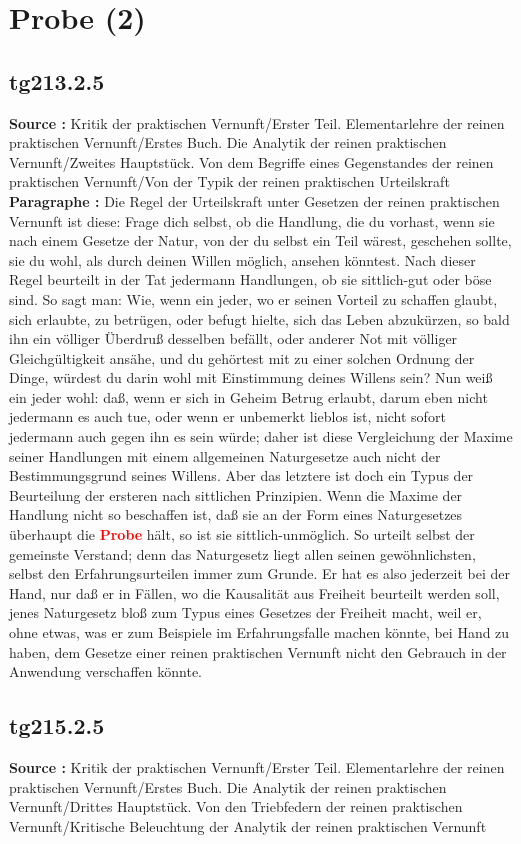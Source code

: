 \documentclass[a4paper,12pt,twoside]{book}
\newcommand{\match}[1]{\textcolor{red}{\textbf{#1}}}
\newcommand{\unnumberedsection}[1]{
	\section*{#1}
	\addcontentsline{toc}{section}{#1}
	\markright{#1}
}
\begin{document}
	\unnumberedsection{Probe (2)} 
	\subsection*{tg213.2.5} 
	\textbf{Source : }Kritik der praktischen Vernunft/Erster Teil. Elementarlehre der reinen praktischen Vernunft/Erstes Buch. Die Analytik der reinen praktischen Vernunft/Zweites Hauptstück. Von dem Begriffe eines Gegenstandes der reinen praktischen Vernunft/Von der Typik der reinen praktischen Urteilskraft\\  
	
	\noindent\textbf{Paragraphe : }Die Regel der Urteilskraft unter Gesetzen der reinen praktischen Vernunft ist diese: Frage dich selbst, ob die Handlung, die du vorhast, wenn sie nach einem Gesetze der Natur, von der du selbst ein Teil wärest, geschehen sollte, sie du wohl, als durch deinen Willen möglich, ansehen könntest. Nach dieser Regel beurteilt in der Tat jedermann Handlungen, ob sie sittlich-gut oder böse sind. So sagt man: Wie, wenn ein jeder, wo er seinen Vorteil zu schaffen glaubt, sich erlaubte, zu betrügen, oder befugt hielte, sich das Leben abzukürzen, so bald ihn ein völliger Überdruß desselben befällt, oder anderer Not mit völliger Gleichgültigkeit ansähe,  und du gehörtest mit zu einer solchen Ordnung der Dinge, würdest du darin wohl mit Einstimmung deines Willens sein? Nun weiß ein jeder wohl: daß, wenn er sich in Geheim Betrug erlaubt, darum eben nicht jedermann es auch tue, oder wenn er unbemerkt lieblos ist, nicht sofort jedermann auch gegen ihn es sein würde; daher ist diese Vergleichung der Maxime seiner Handlungen mit einem allgemeinen Naturgesetze auch nicht der Bestimmungsgrund seines Willens. Aber das letztere ist doch ein Typus der Beurteilung der ersteren nach sittlichen Prinzipien. Wenn die Maxime der Handlung nicht so beschaffen ist, daß sie an der Form eines Naturgesetzes überhaupt die \match{Probe} hält, so ist sie sittlich-unmöglich. So urteilt selbst der gemeinste Verstand; denn das Naturgesetz liegt allen seinen gewöhnlichsten, selbst den Erfahrungsurteilen immer zum Grunde. Er hat es also jederzeit bei der Hand, nur daß er in Fällen, wo die Kausalität aus Freiheit beurteilt werden soll, jenes Naturgesetz bloß zum Typus eines Gesetzes der Freiheit macht, weil er, ohne etwas, was er zum Beispiele im Erfahrungsfalle machen könnte, bei Hand zu haben, dem Gesetze einer reinen praktischen Vernunft nicht den Gebrauch in der Anwendung verschaffen könnte. 
	
	\subsection*{tg215.2.5} 
	\textbf{Source : }Kritik der praktischen Vernunft/Erster Teil. Elementarlehre der reinen praktischen Vernunft/Erstes Buch. Die Analytik der reinen praktischen Vernunft/Drittes Hauptstück. Von den Triebfedern der reinen praktischen Vernunft/Kritische Beleuchtung der Analytik der reinen praktischen Vernunft\\  
	
\end{document}
